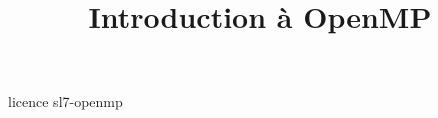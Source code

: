 \documentclass [xcolor=table] {beamer}
\title {Introduction à OpenMP}
\begin{document}
 {licence}
 {sl7-openmp}
\end{document}
